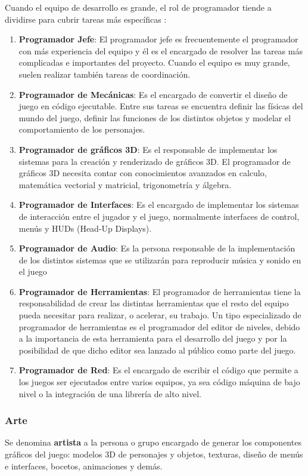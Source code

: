 Cuando el equipo de desarrollo es grande, el rol de programador tiende a dividirse para cubrir tareas más específicas \cite{development_and_production}:
\begin{enumerate}
\item \textbf{Programador Jefe}: El programador jefe es frecuentemente el programador con más experiencia del equipo y él es el encargado de resolver las tareas más complicadas e importantes del proyecto. Cuando el equipo es muy grande, suelen realizar también tareas de coordinación.
\item \textbf{Programador de Mecánicas}: Es el encargado de convertir el diseño de juego en código ejecutable. Entre sus tareas se encuentra definir las físicas del mundo del juego, definir las funciones de los distintos objetos y modelar el comportamiento de los personajes.
\item \textbf{Programador de gráficos 3D}: Es el responsable de implementar los sistemas para la creación y renderizado de gráficos 3D. El programador de gráficos 3D necesita contar con conocimientos avanzados en calculo, matemática vectorial y matricial, trigonometría y álgebra.
\item \textbf{Programador de Interfaces}: Es el encargado de implementar los sistemas de interacción entre el jugador y el juego, normalmente interfaces de control, menús y HUDs (Head-Up Displays). 
\item \textbf{Programador de Audio}: Es la persona responsable de la implementación de los distintos sistemas que se utilizarán para reproducir música y sonido en el juego
\item \textbf{Programador de Herramientas}: El programador de herramientas tiene la responsabilidad de crear las distintas herramientas que el resto del equipo pueda necesitar para realizar, o acelerar, su trabajo. Un tipo especializado de programador de herramientas es el programador del editor de niveles, debido a la importancia de esta herramienta para el desarrollo del juego y por la posibilidad de que dicho editor sea lanzado al público como parte del juego.
\item \textbf{Programador de Red}: Es el encargado de escribir el código que permite a los juegos ser ejecutados entre varios equipos, ya sea código máquina de bajo nivel o la integración de una librería de alto nivel.
\end{enumerate}

\subsubsection{Arte}
Se denomina \textbf{artista} a la persona o grupo encargado de generar los componentes gráficos del juego: modelos 3D de personajes y objetos, texturas, diseño de menús e interfaces, bocetos, animaciones y demás.

